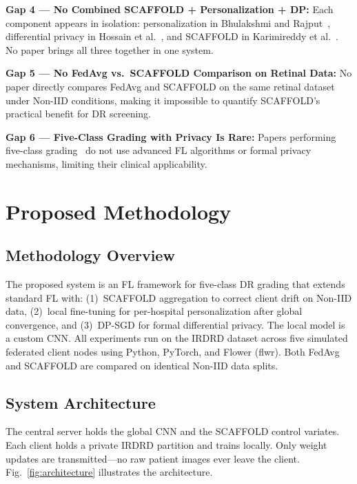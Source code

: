 \documentclass[10pt, conference]{IEEEtran}
\begin{document}
\textbf{Gap 4 --- No Combined SCAFFOLD + Personalization + DP:}
Each component appears in isolation: personalization in Bhulakshmi and
Rajput~\cite{r3}, differential privacy in Hossain et al.~\cite{r12}, and
SCAFFOLD in Karimireddy et al.~\cite{r5}. No paper brings all three together
in one system.

\textbf{Gap 5 --- No FedAvg vs.\ SCAFFOLD Comparison on Retinal Data:}
No paper directly compares FedAvg and SCAFFOLD on the same retinal dataset under
Non-IID conditions, making it impossible to quantify SCAFFOLD's practical benefit
for DR screening.

\textbf{Gap 6 --- Five-Class Grading with Privacy Is Rare:}
Papers performing five-class grading~\cite{r9, r10} do not use advanced FL
algorithms or formal privacy mechanisms, limiting their clinical applicability.

\section{Proposed Methodology}

\subsection{Methodology Overview}

The proposed system is an FL framework for five-class DR grading that extends
standard FL with: (1)~SCAFFOLD aggregation to correct client drift on Non-IID
data, (2)~local fine-tuning for per-hospital personalization after global
convergence, and (3)~DP-SGD for formal differential privacy. The local model is
a custom CNN. All experiments run on the IRDRD dataset across five simulated
federated client nodes using Python, PyTorch, and Flower (flwr). Both FedAvg and
SCAFFOLD are compared on identical Non-IID data splits.

\subsection{System Architecture}

The central server holds the global CNN and the SCAFFOLD control variates. Each
client holds a private IRDRD partition and trains locally. Only weight updates
are transmitted---no raw patient images ever leave the client.
Fig.~\ref{fig:architecture} illustrates the architecture.
\end{document}
